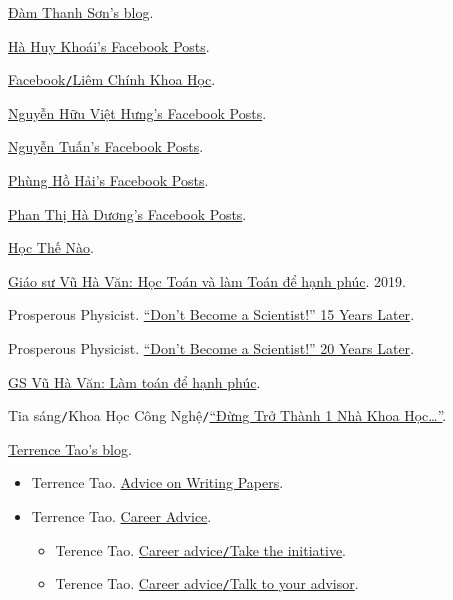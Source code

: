 \documentclass{article}
\numberwithin{equation}{section}
\begin{document}
\begin{thebibliography}{99}
	 \href{https://damtson.wordpress.com/}{Đàm Thanh Sơn's blog}.
	
	 \href{https://www.facebook.com/hahuy.khoai}{Hà Huy Khoái's Facebook Posts}.
	
	 \href{https://www.facebook.com/groups/LiemChinhKhoaHoc}{Facebook\texttt{/}Liêm Chính Khoa Học}.
	
	 \href{https://www.facebook.com/nhvhung}{Nguyễn Hữu Việt Hưng's Facebook Posts}.
	
	 \href{https://www.facebook.com/t.nguyen.2016}{Nguyễn Tuấn's Facebook Posts}.
	
	 \href{https://www.facebook.com/hai.phungho.5}{Phùng Hồ Hải's Facebook Posts}.
	
	 \href{https://www.facebook.com/phan.t.duong.9}{Phan Thị Hà Dương's Facebook Posts}.
	
	 \href{http://hocthenao.vn/}{Học Thế Nào}.
	
	 \href{https://www.mathvn.com/2019/03/giao-su-vu-ha-van-hoc-toan-va-lam-toan.html}{Giáo sư Vũ Hà Văn: Học Toán và làm Toán để hạnh phúc}. 2019.
	
	 Prosperous Physicist. \href{https://www.prosperousphysicist.com/dont-become-a-scientist-15-years-later/}{``Don't Become a Scientist!'' 15 Years Later}.
	
	 Prosperous Physicist. \href{http://www.prosperousphysicist.com/dont-become-a-scientist-20-years-later/}{``Don't Become a Scientist!'' 20 Years Later}.
	
	 \href{https://thanhnien.vn/gs-vu-ha-van-lam-toan-de-hanh-phuc-post15849.html}{GS Vũ Hà Văn: Làm toán để hạnh phúc}.
	
	 Tia sáng\texttt{/}Khoa Học Công Nghệ\texttt{/}\href{https://tiasang.com.vn/khoa-hoc-cong-nghe/dung-tro-thanh-mot-nha-khoa-hoc-903}{``Đừng Trở Thành 1 Nhà Khoa Học\ldots''}.
	
	 \href{https://terrytao.wordpress.com/}{Terrence Tao's blog}.
	\begin{itemize}
		\item Terrence Tao. \href{https://terrytao.wordpress.com/advice-on-writing-papers/}{Advice on Writing Papers}.
		\item Terrence Tao. \href{https://terrytao.wordpress.com/career-advice/}{Career Advice}.
		\begin{itemize}
			\item Terence Tao. \href{https://terrytao.wordpress.com/career-advice/take-the-initiative/}{Career advice\texttt{/}Take the initiative}.
			\item Terence Tao. \href{https://terrytao.wordpress.com/career-advice/talk-to-your-advisor/}{Career advice\texttt{/}Talk to your advisor}.
		\end{itemize}
	\end{itemize}
	

\end{thebibliography}
\end{document}
